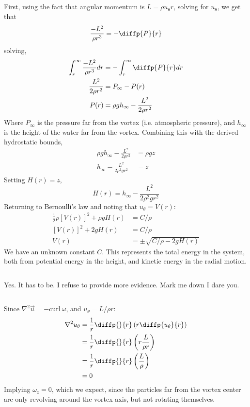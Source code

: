 \documentclass{article}
\begin{document}
\subsection{}
First, using the fact that angular momentum is \(L = \rho u_\theta r\), solving for \(u_\theta\), we get that
\[\frac{-L^2}{\rho r^3} = - \diffp{P}{r} \]
solving,
\begin{align*}
\int_r^\infty \frac{-L^2}{\rho r^3} dr &= - \int_r^\infty \diffp{P}{r} dr \\
\frac{L^2}{2 \rho r^2} &= P_\infty - P(r) \\
P(r) &= \rho g h_\infty - \frac{L^2}{2 \rho r^2}
\end{align*}
Where \(P_\infty\) is the pressure far from the vortex (i.e. atmospheric
pressure), and \(h_\infty\) is the height of the water far from the
vortex. Combining this with the derived hydrostatic bounds,
\begin{align*}
    \rho g h_\infty - \frac{L^2}{2 \rho r^2} &= \rho g z \\
    h_\infty - \frac{L^2}{2 \rho^2 g r^2} &= z
\end{align*}
Setting \(H(r) = z\),
\[ H(r) = h_\infty - \frac{L^2}{2 \rho^2 g r^2}\]
Returning to Bernoulli's law and noting that \(u_\theta = V(r)\):
\begin{align*}
    \frac{1}{2}\rho \left[V(r)\right]^2 + \rho g H(r) &= C/\rho \\
    \left[V(r)\right]^2 + 2 g H(r) &= C/\rho \\
    V(r) &= \pm \sqrt{C/\rho - 2g H(r)}
\end{align*}
We have an unknown constant \(C\). This represents the total energy in the system, both from potential energy in the height, and kinetic energy in the radial motion.

\subsection{}
Yes. It has to be. I refuse to provide more evidence. Mark me down I dare you.

\subsection{}
Since \(\nabla^2 \vec u = - \text{curl}\ \omega\), and \(u_\theta = L/\rho r\):
\begin{align*}
\nabla^2 u_\theta &= \frac{1}{r} \diffp{}{r} \left(r \diffp{u_\theta}{r}\right) \\
&= \frac{1}{r} \diffp{}{r}\left(r \frac{L}{\rho r}\right) \\
&= \frac{1}{r} \diffp{}{r}\left(\frac{L}{\rho}\right) \\
&= 0
\end{align*}
Implying \(\omega_z = 0\), which we expect, since the particles far from the vortex center are only revolving around the vortex axis, but not rotating themselves.
\end{document}
